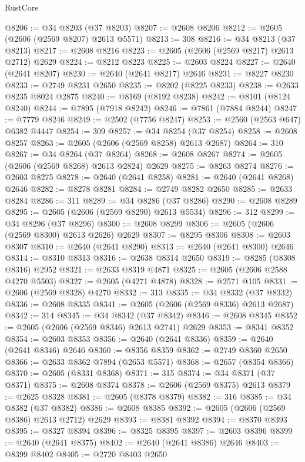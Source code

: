 \begin{lexlean}{RustCore}
\begin{coremodule}
@8206 := @34 @8203 (@37 @8203)
@8207 := @2608 @8206
@8212 := @2605 (@2606 (@2569 @8207) @2613 @5571)
@8213 := 308
@8216 := @34 @8213 (@37 @8213)
@8217 := @2608 @8216
@8223 := @2605 (@2606 (@2569 @8217) @2613 @2712) @2629
@8224 := @8212 @8223
@8225 := @2603 @8224
@8227 := @2640 (@2641 @8207)
@8230 := @2640 (@2641 @8217) @2646
@8231 := @8227 @8230
@8233 := @2749 @8231 @2650
@8235 := @8202 (@8225 @8233)
@8238 := @2633 @8235 @8024 @2875
@8240 := @8169 (@8192 @8238)
@8242 := @8101 (@8124 @8240)
@8244 := @7895 (@7918 @8242)
@8246 := @7861 (@7884 @8244)
@8247 := @7779 @8246
@8249 := @2502 (@7756 @8247)
@8253 := @2560 (@2563 @647) @6382 @4447
@8254 := 309
@8257 := @34 @8254 (@37 @8254)
@8258 := @2608 @8257
@8263 := @2605 (@2606 (@2569 @8258) @2613 @2687)
@8264 := 310
@8267 := @34 @8264 (@37 @8264)
@8268 := @2608 @8267
@8274 := @2605 (@2606 (@2569 @8268) @2613 @2824) @2629
@8275 := @8263 @8274
@8276 := @2603 @8275
@8278 := @2640 (@2641 @8258)
@8281 := @2640 (@2641 @8268) @2646
@8282 := @8278 @8281
@8284 := @2749 @8282 @2650
@8285 := @2633 @8284
@8286 := 311
@8289 := @34 @8286 (@37 @8286)
@8290 := @2608 @8289
@8295 := @2605 (@2606 (@2569 @8290) @2613 @5534)
@8296 := 312
@8299 := @34 @8296 (@37 @8296)
@8300 := @2608 @8299
@8306 := @2605 (@2606 (@2569 @8300) @2613 @2626) @2629
@8307 := @8295 @8306
@8308 := @2603 @8307
@8310 := @2640 (@2641 @8290)
@8313 := @2640 (@2641 @8300) @2646
@8314 := @8310 @8313
@8316 := @2638 @8314 @2650
@8319 := @8285 (@8308 @8316) @2952
@8321 := @2633 @8319 @4871
@8325 := @2605 (@2606 @2588 @4270 @5503)
@8327 := @2605 (@4271 @4878)
@8328 := @2571 @105
@8331 := @2606 (@2569 @8328) @4270
@8332 := 313
@8335 := @34 @8332 (@37 @8332)
@8336 := @2608 @8335
@8341 := @2605 (@2606 (@2569 @8336) @2613 @2687)
@8342 := 314
@8345 := @34 @8342 (@37 @8342)
@8346 := @2608 @8345
@8352 := @2605 (@2606 (@2569 @8346) @2613 @2741) @2629
@8353 := @8341 @8352
@8354 := @2603 @8353
@8356 := @2640 (@2641 @8336)
@8359 := @2640 (@2641 @8346) @2646
@8360 := @8356 @8359
@8362 := @2749 @8360 @2650
@8366 := @2633 @8362 @7894 (@2653 @5571)
@8368 := @2657 (@8354 @8366)
@8370 := @2605 (@8331 @8368)
@8371 := 315
@8374 := @34 @8371 (@37 @8371)
@8375 := @2608 @8374
@8378 := @2606 (@2569 @8375) @2613
@8379 := @2625 @8328
@8381 := @2605 (@8378 @8379)
@8382 := 316
@8385 := @34 @8382 (@37 @8382)
@8386 := @2608 @8385
@8392 := @2605 (@2606 (@2569 @8386) @2613 @2712) @2629
@8393 := @8381 @8392
@8394 := @8370 @8393
@8395 := @8327 @8394
@8396 := @8325 @8395
@8397 := @2603 @8396
@8399 := @2640 (@2641 @8375)
@8402 := @2640 (@2641 @8386) @2646
@8403 := @8399 @8402
@8405 := @2720 @8403 @2650

\end{coremodule}
\end{lexlean}
